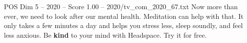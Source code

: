 \begin{textsample}{POS Dim 5 – 2020 – Score 1.00 – 2020/tv\_com\_2020\_67.txt}  \label{ex:f5_pos_036}
Now more than ever, we need to look after our mental health.
Meditation can help with that.
It only takes a few minutes a day and helps you stress less, sleep soundly, and feel less anxious.
Be \textbf{kind} to your mind with Headspace.
Try it for free.

\end{textsample}
